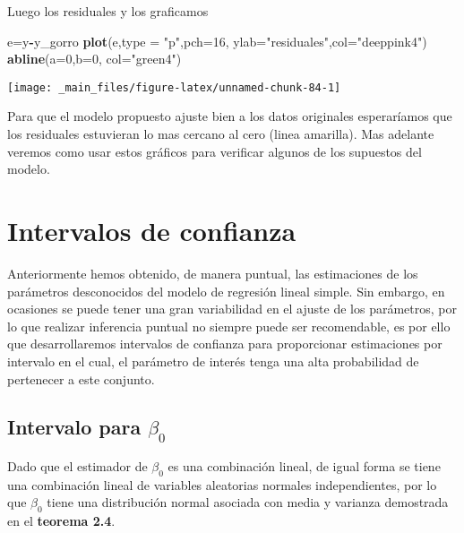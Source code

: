 \documentclass[
  a4paper,
  oneside,
  openany]{book}
\newenvironment{Shaded}{\begin{snugshade}}{\end{snugshade}}
\newcommand{\DataTypeTok}[1]{\textcolor[rgb]{0.13,0.29,0.53}{#1}}
\newcommand{\DecValTok}[1]{\textcolor[rgb]{0.00,0.00,0.81}{#1}}
\newcommand{\KeywordTok}[1]{\textcolor[rgb]{0.13,0.29,0.53}{\textbf{#1}}}
\newcommand{\NormalTok}[1]{#1}
\newcommand{\OperatorTok}[1]{\textcolor[rgb]{0.81,0.36,0.00}{\textbf{#1}}}
\newcommand{\StringTok}[1]{\textcolor[rgb]{0.31,0.60,0.02}{#1}}
\begin{document}
Luego los residuales y los graficamos

\begin{Shaded}
\begin{Highlighting}[]
\NormalTok{e=y}\OperatorTok{{-}}\NormalTok{y\_gorro }
\KeywordTok{plot}\NormalTok{(e,}\DataTypeTok{type =} \StringTok{"p"}\NormalTok{,}\DataTypeTok{pch=}\DecValTok{16}\NormalTok{, }\DataTypeTok{ylab=}\StringTok{"residuales"}\NormalTok{,}\DataTypeTok{col=}\StringTok{"deeppink4"}\NormalTok{) }
\KeywordTok{abline}\NormalTok{(}\DataTypeTok{a=}\DecValTok{0}\NormalTok{,}\DataTypeTok{b=}\DecValTok{0}\NormalTok{, }\DataTypeTok{col=}\StringTok{"green4"}\NormalTok{)}
\end{Highlighting}
\end{Shaded}

\begin{center}\texttt{[image: \_main\_files/figure-latex/unnamed-chunk-84-1]} \end{center}

Para que el modelo propuesto ajuste bien a los datos originales esperaríamos que los residuales estuvieran lo mas cercano al cero (linea amarilla). Mas adelante veremos como usar estos gráficos para verificar algunos de los supuestos del modelo.

\hypertarget{intervalos-de-confianza-1}{%
\chapter{Intervalos de confianza}\label{intervalos-de-confianza-1}}

Anteriormente hemos obtenido, de manera puntual, las estimaciones de los parámetros desconocidos del modelo de regresión lineal simple. Sin embargo, en ocasiones se puede tener una gran variabilidad en el ajuste de los parámetros, por lo que realizar inferencia puntual no siempre puede ser recomendable, es por ello que desarrollaremos intervalos de confianza para proporcionar estimaciones por intervalo en el cual, el parámetro de interés tenga una alta probabilidad de pertenecer a este conjunto.

\hypertarget{intervalo-para-beta_0}{%
\section{\texorpdfstring{Intervalo para \(\beta_{0}\)}{Intervalo para \textbackslash beta\_\{0\}}}\label{intervalo-para-beta_0}}

Dado que el estimador de \(\beta_{0}\) es una combinación lineal, de igual forma se tiene una combinación lineal de variables aleatorias normales independientes, por lo que \(\beta_{0}\) tiene una distribución normal asociada con media y varianza demostrada en el \textbf{teorema 2.4}.
\end{document}
